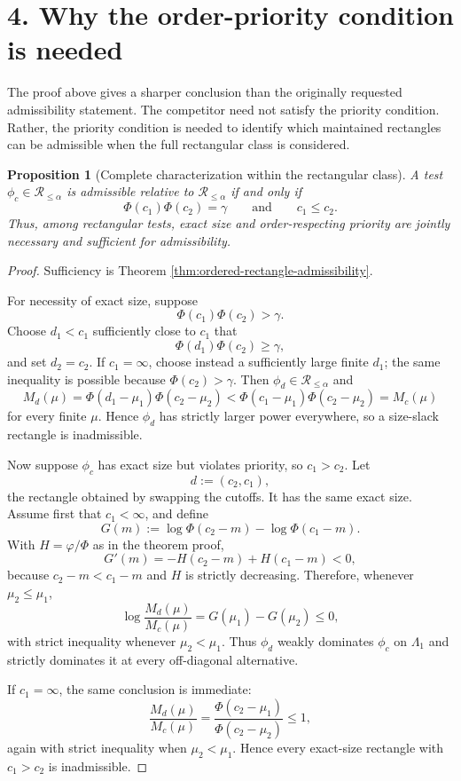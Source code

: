 \documentclass[12pt]{article}
\newtheorem{proposition}{Proposition}
\theoremstyle{definition}
\theoremstyle{remark}
\newcommand{\phidens}{\varphi}
\newcommand{\phitest}{\phi}
\newcommand{\gammalev}{\gamma}
\begin{document}
\section*{4. Why the order-priority condition is needed}

The proof above gives a sharper conclusion than the originally requested admissibility statement. The competitor need not satisfy the priority condition. Rather, the priority condition is needed to identify which maintained rectangles can be admissible when the full rectangular class is considered.

\begin{proposition}[Complete characterization within the rectangular class]\label{prop:rectangle-characterization}
A test $\phitest_c\in\mathcal R_{\le\alpha}$ is admissible relative to $\mathcal R_{\le\alpha}$ if and only if
\[
\Phi(c_1)\Phi(c_2)=\gammalev
\qquad\text{and}\qquad
c_1\le c_2.
\]
Thus, among rectangular tests, exact size and order-respecting priority are jointly necessary and sufficient for admissibility.
\end{proposition}

\begin{proof}
Sufficiency is Theorem \ref{thm:ordered-rectangle-admissibility}.

For necessity of exact size, suppose
\[
\Phi(c_1)\Phi(c_2)>\gammalev.
\]
Choose $d_1<c_1$ sufficiently close to $c_1$ that
\[
\Phi(d_1)\Phi(c_2)\ge\gammalev,
\]
and set $d_2=c_2$. If $c_1=\infty$, choose instead a sufficiently large finite $d_1$; the same inequality is possible because $\Phi(c_2)>\gammalev$. Then $\phitest_d\in\mathcal R_{\le\alpha}$ and
\[
M_d(\mu)
=
\Phi(d_1-\mu_1)\Phi(c_2-\mu_2)
<
\Phi(c_1-\mu_1)\Phi(c_2-\mu_2)
=
M_c(\mu)
\]
for every finite $\mu$. Hence $\phitest_d$ has strictly larger power everywhere, so a size-slack rectangle is inadmissible.

Now suppose $\phitest_c$ has exact size but violates priority, so $c_1>c_2$. Let
\[
d:=(c_2,c_1),
\]
the rectangle obtained by swapping the cutoffs. It has the same exact size. Assume first that $c_1<\infty$, and define
\[
G(m):=\log\Phi(c_2-m)-\log\Phi(c_1-m).
\]
With $H=\phidens/\Phi$ as in the theorem proof,
\[
G'(m)=-H(c_2-m)+H(c_1-m)<0,
\]
because $c_2-m<c_1-m$ and $H$ is strictly decreasing. Therefore, whenever $\mu_2\le\mu_1$,
\[
\log\frac{M_d(\mu)}{M_c(\mu)}
=
G(\mu_1)-G(\mu_2)
\le0,
\]
with strict inequality whenever $\mu_2<\mu_1$. Thus $\phitest_d$ weakly dominates $\phitest_c$ on $\Lambda_1$ and strictly dominates it at every off-diagonal alternative.

If $c_1=\infty$, the same conclusion is immediate:
\[
\frac{M_d(\mu)}{M_c(\mu)}
=
\frac{\Phi(c_2-\mu_1)}{\Phi(c_2-\mu_2)}
\le1,
\]
again with strict inequality when $\mu_2<\mu_1$. Hence every exact-size rectangle with $c_1>c_2$ is inadmissible.
\end{proof}
\end{document}
